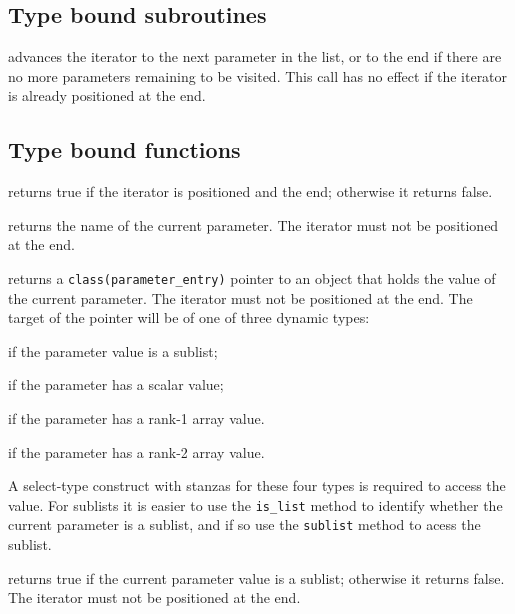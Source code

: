 \documentclass[11pt]{article}
\begin{document}
\subsection{Type bound subroutines}
\begin{description}[style=nextline]\setlength{\itemsep}{0pt}
\item[\texttt{next()}]
  advances the iterator to the next parameter in the list, or to the end if
  there are no more parameters remaining to be visited.  This call has no
  effect if the iterator is already positioned at the end. 
\end{description}

\subsection{Type bound functions}
\begin{description}[style=nextline]\setlength{\itemsep}{0pt}
\item[\texttt{at_end()}]
  returns true if the iterator is positioned and the end; otherwise it
  returns false.
\item[\texttt{name()}]
  returns the name of the current parameter.  The iterator must not be
  positioned at the end.
\item[\texttt{value()}]
  returns a \texttt{class(parameter_entry)} pointer to an object that holds
  the value of the current parameter.  The iterator must not be positioned
  at the end. The target of the pointer will be of one of three dynamic types:
  \begin{description}\setlength{\itemsep}{0pt}
  \item[\texttt{parameter_list}] if the parameter value is a sublist;
  \item[\texttt{any_scalar}] if the parameter has a scalar value;
  \item[\texttt{any_vector}] if the parameter has a rank-1 array value.
  \item[\texttt{any_matrix}] if the parameter has a rank-2 array value.
  \end{description}
  A select-type construct with stanzas for these four types is required
  to access the value.  For sublists it is easier to use the \texttt{is_list}
  method to identify whether the current parameter is a sublist, and if so
  use the \texttt{sublist} method to acess the sublist.
\item[\texttt{is_list()}]
  returns true if the current parameter value is a sublist; otherwise it
  returns false.  The iterator must not be positioned at the end.

\end{description}
\end{document}
